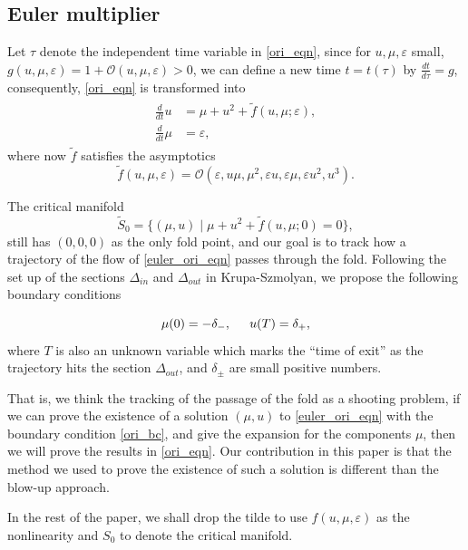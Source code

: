 \documentclass[letterpaper,11pt]{article}
\newcommand{\rmO}{\mathcal{O}}
\newcommand{\eps}{\varepsilon}
\numberwithin{equation}{section}
\theoremstyle{plain}
\begin{document}
\subsection{Euler multiplier}\label{euler_m}
Let $\tau$ denote the independent time variable in \eqref{ori_eqn}, since for $u,\mu,\eps$ small, $g(u,\mu,\eps) = 1 + \rmO(u,\mu,\eps)>0$, we can define a new time $t = t(\tau)$ by $\frac{dt}{d\tau} = g$, consequently, \eqref{ori_eqn}  is transformed into
\begin{align}\label{euler_ori_eqn}
\begin{split}
\frac{d}{dt}u &= \mu+u^2+ \tilde{f}(u,\mu;\eps),\\
\frac{d}{dt}\mu &=  \eps ,
\end{split}
\end{align}
where now $\tilde{f}$ satisfies the asymptotics
\begin{equation}\label{nonlinear_asy_new}
\tilde{f}(u,\mu,\eps) = \rmO(\eps,  u\mu, \mu^2,\eps u, \eps \mu, \eps u^2, u^3).
\end{equation}  

The critical manifold 
\[
\tilde{S}_0 = \{ (\mu, u) \mid \mu + u^2 + \tilde{f}(u,\mu;0) = 0\},
\]
still has $(0,0,0)$ as the only fold point, and our goal is to track how a trajectory of the flow of \eqref{euler_ori_eqn} passes through the fold. Following the set up of the sections $\Delta_{in}$ and $\Delta_{out}$ in Krupa-Szmolyan, we propose the following boundary conditions

\begin{equation}\label{ori_bc}
\mu(0) = -\delta_-, \hspace{0.2in} u(T) = \delta_+,
\end{equation}
where $T$ is also an unknown variable which marks the ``time of exit'' as the trajectory hits the section $\Delta_{out}$, and $\delta_{\pm}$ are small positive numbers.

That is, we think the tracking of the passage of the fold as a shooting problem, if we can prove the existence of a solution $(\mu, u)$ to \eqref{euler_ori_eqn} with the boundary condition \eqref{ori_bc}, and give the expansion for the components $\mu$, then we will prove the results in \eqref{ori_eqn}. Our contribution in this paper is that the method we used to prove the existence of such a solution is different than the blow-up approach.

In the rest of the paper, we shall drop the tilde to use $f(u,\mu,\eps)$ as the nonlinearity and $S_0$ to denote the critical manifold.
\end{document}
